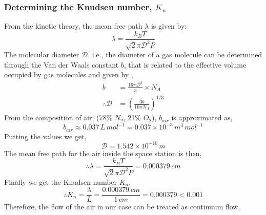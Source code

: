 \documentclass[a4paper, 14pt]{extarticle}
\begin{document}
\subsubsection*{Determining the Knudsen number, $K_n$}
From the kinetic theory, the mean free path $\lambda$ is given by:
\[ \lambda = \frac{k_B T}{\sqrt{2} \pi \mathcal{D}^2 P} \]
The molecular diameter $\mathcal{D}$, i.e., the diameter of a gas molecule can be determined through the Van der Waals constant $b$, that is related to the effective volume occupied by gas molecules and given by \citep{atkins2006},
\begin{align*}
    b &= \frac{16 \pi \mathcal{D}^3}{3} \times N_A \\
    \therefore \mathcal{D} &= \left( \frac{3b}{16 \pi N_A} \right)^{1/3}
\end{align*}
From the composition of air, (78\% $N_2$, 21\% $O_2$), $b_{air}$ is approximated as,
\[ b_{air} \approx 0.037 \, L\,mol^{-1} = 0.037 \times 10^{-3} \,m^3\,mol^{-1} \]
Putting the values we get, 
$$\mathcal{D} = 1.542 \times 10^{-10} \,m$$
The mean free path for the air inside the space station is then,
$$\therefore \lambda = \frac{k_B T}{\sqrt{2} \pi \mathcal{D}^2 P} = 0.000379 \,cm$$
Finally we get the Knudsen number $K_n$,
$$\therefore K_n = \frac{\lambda}{L} = \frac{0.000379\,cm}{1\,cm} = 0.000379 < 0.001 $$
Therefore, the flow of the air in our case can be treated as continuum flow.
\end{document}
